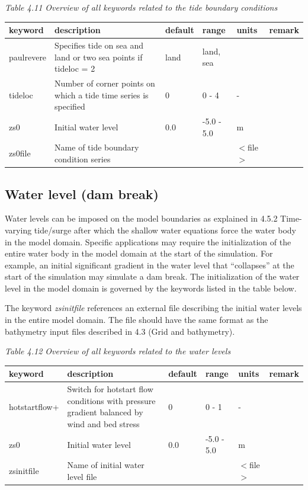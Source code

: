 \documentclass{article}
\begin{document}
\noindent \textit{Table 4.11 Overview of all keywords related to the tide boundary conditions}

\begin{tabular}{|p{0.8in}|p{1.0in}|p{0.6in}|p{0.7in}|p{0.5in}|p{0.6in}|} \hline 
keyword & description & default & range & units & remark \\ \hline 
paulrevere & Specifies tide on sea and land or two sea points if tideloc = 2 & land & land, sea &  &  \\ \hline 
tideloc & Number of corner points on which a tide time series is specified & 0 & 0 - 4 & - &  \\ \hline 
zs0 & Initial water level & 0.0 & -5.0 - 5.0 & m &  \\ \hline 
zs0file & Name of tide boundary condition series &  &  & $<$file$>$ &  \\ \hline 
\end{tabular}


\subsection{ Water level (dam break)}

\noindent Water levels can be imposed on the model boundaries as explained in 4.5.2 Time-varying tide/surge after which the shallow water equations force the water body in the model domain. Specific applications may require the initialization of the entire water body in the model domain at the start of the simulation. For example, an initial significant gradient in the water level that ``collapses'' at the start of the simulation may simulate a dam break. The initialization of the water level in the model domain is governed by the keywords listed in the table below.

\noindent The keyword \textit{zsinitfile} references an external file describing the initial water levels in the entire model domain. The file should have the same format as the bathymetry input files described in 4.3 (Grid and bathymetry).

\noindent \eject \textit{}

\noindent \textit{Table 4.12 Overview of all keywords related to the water levels}

\begin{tabular}{|p{0.8in}|p{1.0in}|p{0.6in}|p{0.6in}|p{0.5in}|p{0.6in}|} \hline 
keyword & description & default & range & units & remark \\ \hline 
hotstartflow+ & Switch for hotstart flow conditions with pressure gradient balanced by wind and bed stress & 0 & 0 - 1 & - &  \\ \hline 
zs0 & Initial water level & 0.0 & -5.0 - 5.0 & m &  \\ \hline 
zsinitfile & Name of initial water level file &  &  & $<$file$>$ &  \\ \hline 
\end{tabular}
\end{document}
